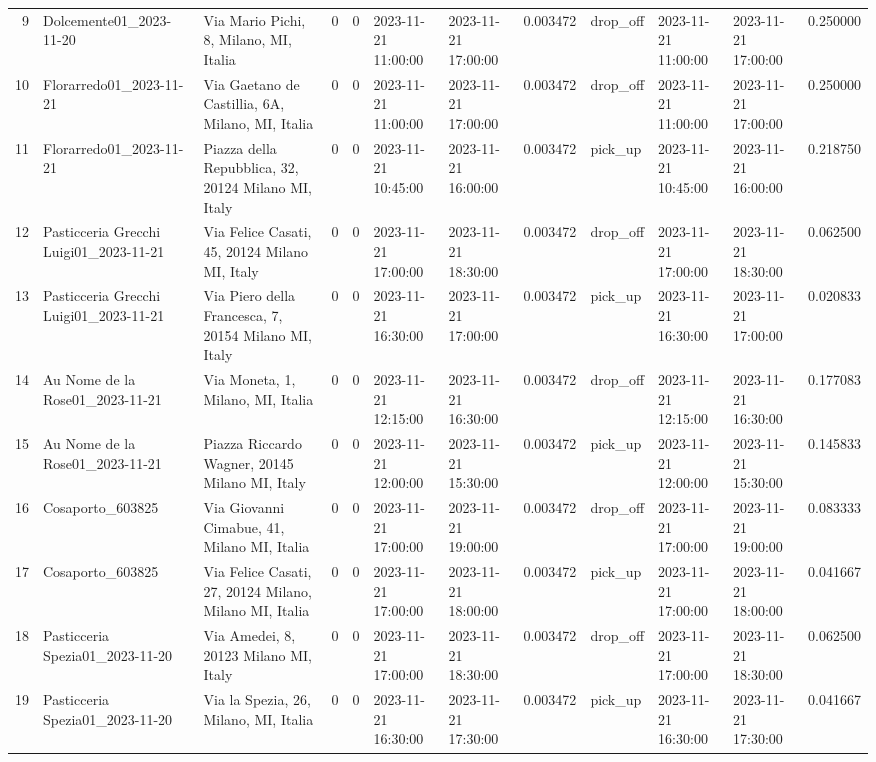 \documentclass[titlepage]{article}
\begin{document}
\begin{table}[H]
\begin{adjustbox}{max width=\textwidth}
\begin{tabular}{rllrrllrlllr}
9 & Dolcemente01\_2023-11-20 & Via Mario Pichi, 8, Milano, MI, Italia & 0 & 0 & 2023-11-21 11:00:00 & 2023-11-21 17:00:00 & 0.003472 & drop\_off & 2023-11-21 11:00:00 & 2023-11-21 17:00:00 & 0.250000 \\
10 & Florarredo01\_2023-11-21 & Via Gaetano de Castillia, 6A, Milano, MI, Italia & 0 & 0 & 2023-11-21 11:00:00 & 2023-11-21 17:00:00 & 0.003472 & drop\_off & 2023-11-21 11:00:00 & 2023-11-21 17:00:00 & 0.250000 \\
11 & Florarredo01\_2023-11-21 & Piazza della Repubblica, 32, 20124 Milano MI, Italy & 0 & 0 & 2023-11-21 10:45:00 & 2023-11-21 16:00:00 & 0.003472 & pick\_up & 2023-11-21 10:45:00 & 2023-11-21 16:00:00 & 0.218750 \\
12 & Pasticceria Grecchi Luigi01\_2023-11-21 & Via Felice Casati, 45, 20124 Milano MI, Italy & 0 & 0 & 2023-11-21 17:00:00 & 2023-11-21 18:30:00 & 0.003472 & drop\_off & 2023-11-21 17:00:00 & 2023-11-21 18:30:00 & 0.062500 \\
13 & Pasticceria Grecchi Luigi01\_2023-11-21 & Via Piero della Francesca, 7, 20154 Milano MI, Italy & 0 & 0 & 2023-11-21 16:30:00 & 2023-11-21 17:00:00 & 0.003472 & pick\_up & 2023-11-21 16:30:00 & 2023-11-21 17:00:00 & 0.020833 \\
14 & Au Nome de la Rose01\_2023-11-21 & Via Moneta, 1, Milano, MI, Italia & 0 & 0 & 2023-11-21 12:15:00 & 2023-11-21 16:30:00 & 0.003472 & drop\_off & 2023-11-21 12:15:00 & 2023-11-21 16:30:00 & 0.177083 \\
15 & Au Nome de la Rose01\_2023-11-21 & Piazza Riccardo Wagner, 20145 Milano MI, Italy & 0 & 0 & 2023-11-21 12:00:00 & 2023-11-21 15:30:00 & 0.003472 & pick\_up & 2023-11-21 12:00:00 & 2023-11-21 15:30:00 & 0.145833 \\
16 & Cosaporto\_603825 & Via Giovanni Cimabue, 41, Milano MI, Italia & 0 & 0 & 2023-11-21 17:00:00 & 2023-11-21 19:00:00 & 0.003472 & drop\_off & 2023-11-21 17:00:00 & 2023-11-21 19:00:00 & 0.083333 \\
17 & Cosaporto\_603825 & Via Felice Casati, 27, 20124 Milano, Milano MI, Italia & 0 & 0 & 2023-11-21 17:00:00 & 2023-11-21 18:00:00 & 0.003472 & pick\_up & 2023-11-21 17:00:00 & 2023-11-21 18:00:00 & 0.041667 \\
18 & Pasticceria Spezia01\_2023-11-20 & Via Amedei, 8, 20123 Milano MI, Italy & 0 & 0 & 2023-11-21 17:00:00 & 2023-11-21 18:30:00 & 0.003472 & drop\_off & 2023-11-21 17:00:00 & 2023-11-21 18:30:00 & 0.062500 \\
19 & Pasticceria Spezia01\_2023-11-20 & Via la Spezia, 26, Milano, MI, Italia & 0 & 0 & 2023-11-21 16:30:00 & 2023-11-21 17:30:00 & 0.003472 & pick\_up & 2023-11-21 16:30:00 & 2023-11-21 17:30:00 & 0.041667 \\

\end{tabular}
\end{adjustbox}
\end{table}
\end{document}
